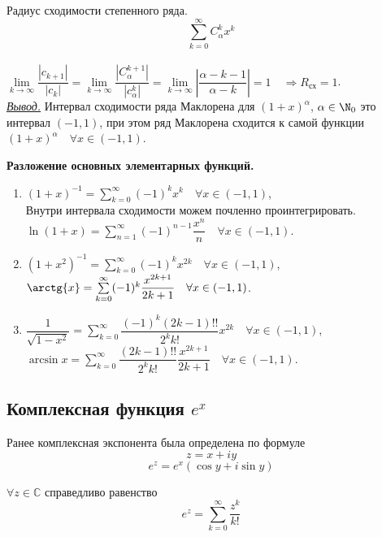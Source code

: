 \begin{remark}
    Радиус сходимости степенного ряда. \\
    $$\sum \limits_{k=0}^\infty C_\alpha^k x^k$$ \\
    $\lim \limits_{k \to \infty} \dfrac{|c_{k+1}|}{|c_k|} = \lim \limits_{k \to \infty} \dfrac{|C_\alpha^{k+1}|}{|c_\alpha^k|} = \lim \limits_{k \to \infty} \left| \dfrac{\alpha - k - 1}{\alpha - k} \right| = 1 \quad \Longrightarrow R_{\text{сх}} = 1$. \\

    \underline{\textit{Вывод.}} Интервал сходимости ряда Маклорена для $(1+x)^\alpha$, $\alpha \in \N_0$ это интервал $(-1, 1)$, при этом ряд Маклорена сходится к самой функции $(1+x)^\alpha \quad \forall x \in (-1, 1)$.
\end{remark}

\textbf{Разложение основных элементарных функций.}
\begin{enumerate}
    \item $(1+x)^{-1} = \sum \limits_{k=0}^\infty (-1)^k x^k \quad \forall x \in (-1, 1)$, \\
    Внутри интервала сходимости можем почленно проинтегрировать. \\
    $\ln(1+x) = \sum \limits_{n=1}^\infty (-1)^{n-1} \dfrac{x^n}{n} \quad \forall x \in (-1, 1)$.
    \item $(1+x^2)^{-1} = \sum \limits_{k=0}^\infty (-1)^k x^{2k} \quad \forall x \in (-1, 1)$, \\
    $\arctg{x} = \sum \limits_{k=0}^\infty (-1)^{k} \dfrac{x^{2k+1}}{2k+1} \quad \forall x \in (-1, 1)$.

    \item $\dfrac{1}{\sqrt{1-x^2}} = \sum \limits_{k=0}^\infty \dfrac{(-1)^k (2k-1)!!}{2^k k!} x^{2k} \quad \forall x \in (-1, 1)$, \\
    $\arcsin{x} = \sum \limits_{k=0}^\infty \dfrac{(2k-1)!!}{2^k k!} \dfrac{x^{2k+1}}{2k+1} \quad \forall x \in (-1, 1)$.
\end{enumerate}

\subsection{Комплексная функция $e^x$}
Ранее комплексная экспонента была определена по формуле
$$z = x + iy$$
$$e^z = e^x (\cos{y} + i \sin{y})$$

\begin{theorem}
    $\forall z \in \mathbb{C}$ справедливо равенство $$ e^z = \sum \limits_{k=0}^\infty \dfrac{z^k}{k!} $$
\end{theorem}

